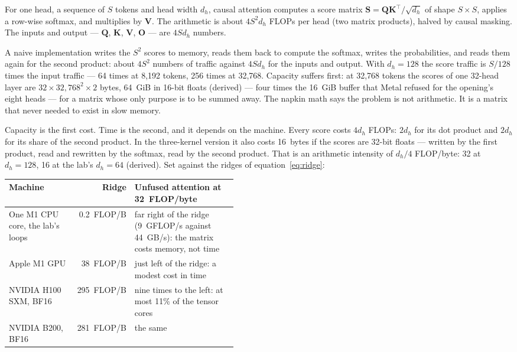 
For one head, a sequence of $S$ tokens and head width $d_h$, causal attention
computes a score matrix $\mathbf{S}=\mathbf{Q}\mathbf{K}^{\top}/\sqrt{d_h}$ of
shape $S\times S$, applies a row-wise softmax, and multiplies by
$\mathbf{V}$. The arithmetic is about $4S^{2}d_h$ FLOPs per head (two matrix
products), halved by causal masking. The inputs and output --- $\mathbf{Q}$,
$\mathbf{K}$, $\mathbf{V}$, $\mathbf{O}$ --- are $4Sd_h$ numbers.

A naive implementation writes the $S^{2}$ scores to memory, reads them back
to compute the softmax, writes the probabilities, and reads them again for the
second product: about $4S^{2}$ numbers of traffic against $4Sd_h$ for the
inputs and output. With $d_h=128$ the score traffic is $S/128$ times the
input traffic --- 64 times at 8,192 tokens, 256 times at 32,768. Capacity
suffers first: at 32,768 tokens the scores of one 32-head layer are
$32\times32{,}768^{2}\times2$ bytes, 64~GiB in 16-bit floats (derived) ---
four times the 16~GiB buffer that Metal refused for the opening's eight
heads --- for a matrix whose only purpose is to be summed away. The napkin math says the
problem is not arithmetic. It is a matrix that never needed to exist in slow
memory.

Capacity is the first cost. Time is the second, and it depends on the machine.
Every score costs $4d_h$ FLOPs: $2d_h$ for its dot product and $2d_h$ for its
share of the second product. In the three-kernel version it also costs
16~bytes if the scores are 32-bit floats --- written by the first product, read
and rewritten by the softmax, read by the second product. That is an arithmetic
intensity of $d_h/4$ FLOP/byte: 32 at $d_h = 128$, 16 at the lab's $d_h = 64$
(derived). Set against the ridges of equation~\eqref{eq:ridge}:

\begin{center}\small
\begin{tabular}{@{}lr>{\raggedright\arraybackslash}p{0.45\linewidth}@{}}
\toprule
Machine & Ridge & Unfused attention at 32~FLOP/byte \\
\midrule
One M1 CPU core, the lab's loops & 0.2~FLOP/B & far right of the ridge (9~GFLOP/s against 44~GB/s): the matrix costs memory, not time \\
Apple M1 GPU & 38~FLOP/B & just left of the ridge: a modest cost in time \\
NVIDIA H100 SXM, BF16 & 295~FLOP/B & nine times to the left: at most 11\% of the tensor cores \\
NVIDIA B200, BF16 & 281~FLOP/B & the same \\
\bottomrule
\end{tabular}
\end{center}

